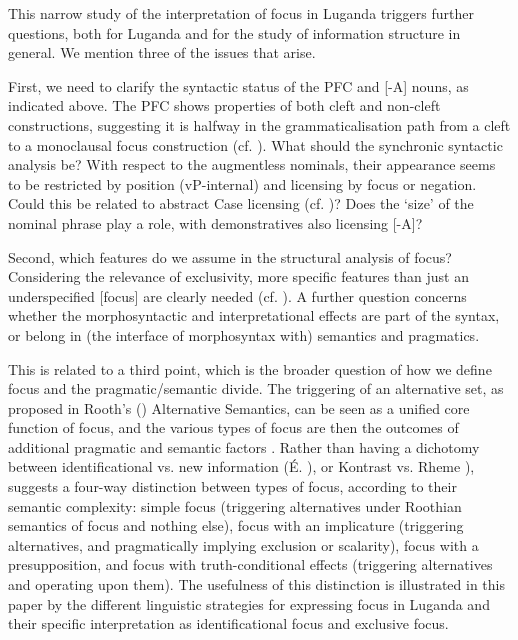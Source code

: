 \documentclass[output=paper]{langsci/langscibook}
\begin{document}
This narrow study of the interpretation of focus in Luganda triggers further questions, both for Luganda and for the study of information structure in general. We mention three of the issues that arise.

First, we need to clarify the syntactic status of the PFC and [-A] nouns, as indicated above. The PFC shows properties of both cleft and non-cleft constructions, suggesting it is halfway in the grammaticalisation path from a cleft to a monoclausal focus construction (cf. \citealt{HeineReh1983,HarrisCampbell1995,VanderWalManiacky2015}). What should the synchronic syntactic analysis be? With respect to the augmentless nominals, their appearance seems to be restricted by position (vP-internal) and licensing by focus or negation. Could this be related to abstract Case licensing (cf. \citealt{Halpert2012,Halpert2013,Carstens2013,CarstensMletshe2015})? Does the ‘size’ of the nominal phrase play a role, with demonstratives also licensing [-A]?

Second, which features do we assume in the structural analysis of focus? Considering the relevance of exclusivity, more specific features than just an underspecified [focus] are clearly needed (cf. \citealt{NeelemanEtAl2009}). A further question concerns whether the morphosyntactic and interpretational effects are part of the syntax, or belong in (the interface of morphosyntax with) semantics and pragmatics.

This is related to a third point, which is the broader question of how we define focus and the pragmatic/semantic divide. The triggering of an alternative set, as proposed in Rooth’s (\citeyear*{Rooth1985,Rooth1992,Rooth1996}) Alternative Semantics, can be seen as a unified core function of focus, and the various types of focus are then the outcomes of additional pragmatic and semantic factors \citep{ZimmermannOnea2011}. Rather than having a dichotomy between identificational vs. new information (É. \citealt{Kiss1998}), or Kontrast vs. Rheme \citep{VallduviVilkuna1998}), \citet{Bazalgette2015} suggests a four-way distinction between types of focus, according to their semantic complexity: simple focus (triggering alternatives under Roothian semantics of focus and nothing else), focus with an implicature (triggering alternatives, and pragmatically implying exclusion or scalarity), focus with a presupposition, and focus with truth-conditional effects (triggering alternatives and operating upon them). The usefulness of this distinction is illustrated in this paper by the different linguistic strategies for expressing focus in Luganda and their specific interpretation as identificational focus and exclusive focus.
\end{document}
